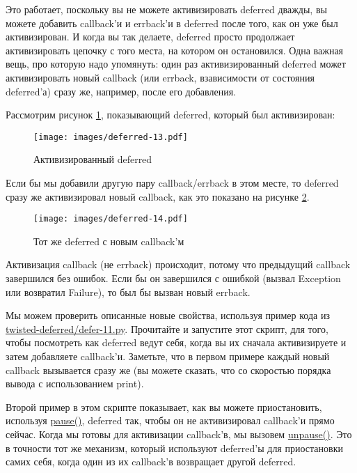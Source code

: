 Это работает, поскольку вы не можете активизировать 
deferred дважды, вы можете добавить callback'и и 
errback'и в deferred после того, как он уже был активизирован. 
И когда вы так делаете, deferred просто продолжает 
активизировать цепочку с того места, на котором он остановился. 
Одна важная вещь, про которую надо упомянуть: один раз 
активизированный deferred может активизировать новый callback (или 
errback, взависимости от состояния deferred'а) сразу же, например, 
после его добавления. 

Рассмотрим рисунок \ref{fig:deferred-13}, показывающий deferred, 
который был активизирован:

\begin{figure}[h]
\begin{center}
\texttt{[image: images/deferred-13.pdf]} 
\caption{Активизированный deferred}\label{fig:deferred-13}
\end{center}
\end{figure}

Если бы мы добавили другую пару callback/errback 
в этом месте, то deferred сразу же активизировал новый 
callback, как это показано на рисунке \ref{fig:deferred-14}.

\begin{figure}[h]
\begin{center}
\texttt{[image: images/deferred-14.pdf]} 
\caption{Тот же deferred с новым callback'м}\label{fig:deferred-14}
\end{center}
\end{figure}


Активизация callback (не errback) происходит, потому что 
предыдущий callback завершился без ошибок. Если бы он 
завершился с ошибкой (вызвал Exception или возвратил Failure), 
то был бы вызван новый errback.


Мы можем проверить описанные новые свойства, используя пример кода из 
\href{http://github.com/jdavisp3/twisted-intro/blob/master/twisted-deferred/defer-11.py#L1}{twisted-deferred/defer-11.py}. Прочитайте и запустите этот скрипт, 
для того, чтобы посмотреть как deferred ведут себя, когда 
вы их сначала активизируете и затем добавляете callback'и. 
Заметьте, что в первом примере каждый новый callback 
вызывается сразу же (вы можете сказать, что со скоростью порядка вывода 
с использованием print).


Второй пример в этом скрипте показывает, как вы можете 
приостановить, используя  
\href{http://twistedmatrix.com/trac/browser/tags/releases/twisted-8.2.0/twisted/internet/defer.py#L272}{pause()}, deferred так, чтобы он не активизировал 
callback'и прямо сейчас. Когда мы готовы для 
активизации callback'в, мы вызовем 
\href{http://twistedmatrix.com/trac/browser/tags/releases/twisted-8.2.0/twisted/internet/defer.py#L278}{unpause()}. Это в точности тот же механизм, который 
используют deferred'ы для приостановки 
самих себя, когда один из их callback'в возвращает другой deferred. 

